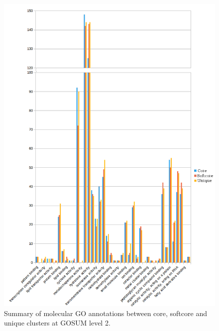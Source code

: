 \documentclass[12pt]{article}
\begin{document}
\begin{figure} 
\includegraphics[scale=.78]{3Aug18_cluster-investigation/figures/gosum-pan/Pan-gosum2-molec-split.png} 
\caption{Summary of molecular GO annotations between core, softcore and unique clusters at GOSUM level 2.} 
\label{fig:PanGo2Molec}
\end{figure} 
\FloatBarrier
\end{document}

